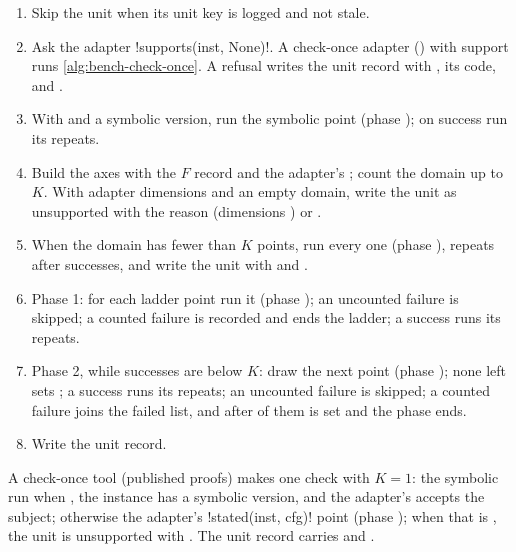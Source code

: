 \begin{algorithm}\label{alg:bench-execute}
\begin{enumerate}
\item Skip the unit when its unit key  is logged and not stale.
\item Ask the adapter \py!supports(inst, None)!. A check-once adapter
  () with support runs \cref{alg:bench-check-once}. A refusal writes the unit
  record with , its code, and .
\item With  and a symbolic version, run the symbolic point (phase
  ); on success run its repeats.
\item Build the axes with the $F$ record and the adapter's ; count the domain up
  to $K$. With adapter dimensions and an empty domain, write the unit as unsupported with the
  reason  (dimensions ) or .
\item When the domain has fewer than $K$ points, run every one (phase ), repeats after
  successes, and write the unit with  and .
\item Phase 1: for each ladder point run it (phase ); an uncounted failure is
  skipped; a counted failure is recorded and ends the ladder; a success runs its repeats.
\item Phase 2, while successes are below $K$: draw the next point (phase ); none
  left sets ; a success runs its repeats; an uncounted failure is
  skipped; a counted failure joins the failed list, and after  of
  them  is set and the phase ends.
\item Write the unit record.
\end{enumerate}
\end{algorithm}

\begin{algorithm}\label{alg:bench-check-once}
A check-once tool (published proofs) makes one check with $K=1$: the symbolic run when
, the instance has a symbolic version, and the adapter's
 accepts the subject; otherwise the adapter's \py!stated(inst, cfg)!
point (phase ); when that is , the unit is unsupported with . The unit record carries  and
.
\end{algorithm}

